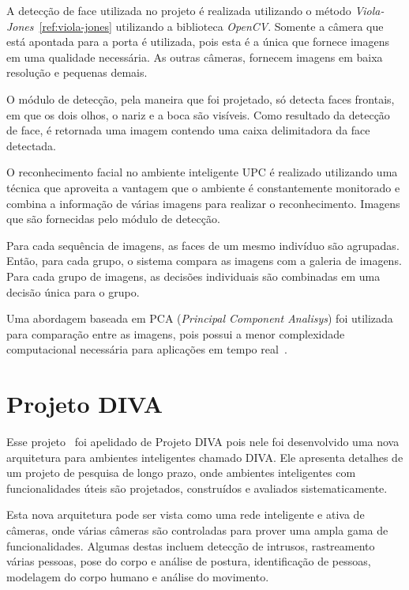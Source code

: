 A detecção de face utilizada no projeto é realizada utilizando o método \textit{Viola-Jones}~\ref{ref:viola-jones} utilizando a biblioteca \textit{OpenCV}. Somente a câmera que está apontada para a porta é utilizada, pois esta é a única que fornece imagens em uma qualidade necessária. As outras câmeras, fornecem imagens em baixa resolução e pequenas demais.  

O módulo de detecção, pela maneira que foi projetado, só detecta faces frontais, em que os dois olhos, o nariz e a boca são visíveis. Como resultado da detecção de face, é retornada uma imagem contendo uma caixa delimitadora da face detectada.

O reconhecimento facial no ambiente inteligente UPC é realizado utilizando uma técnica que aproveita a vantagem que o ambiente é constantemente monitorado e combina a informação de várias imagens para realizar o reconhecimento.  Imagens que são fornecidas pelo módulo de detecção.

Para cada sequência de imagens, as faces de um mesmo indivíduo são agrupadas. Então, para cada grupo, o sistema compara as imagens com a galeria de imagens. Para cada grupo de imagens, as decisões individuais são combinadas em uma decisão única para o grupo.

Uma abordagem baseada em PCA (\textit{Principal Component Analisys}) foi utilizada para comparação entre as imagens, pois possui a menor complexidade computacional necessária para aplicações em tempo real~\cite{salah}.


\section{Projeto DIVA}

Esse projeto~\cite{trivedi} foi apelidado de Projeto DIVA pois nele foi desenvolvido uma nova arquitetura para ambientes inteligentes chamado DIVA. Ele apresenta detalhes de um projeto de pesquisa de longo prazo, onde ambientes inteligentes com funcionalidades úteis são projetados, construídos e avaliados sistematicamente. 

Esta nova arquitetura pode ser vista como uma rede inteligente e ativa de câmeras, onde várias câmeras são controladas para prover uma ampla gama de funcionalidades. Algumas destas incluem detecção de intrusos, rastreamento várias pessoas, pose do corpo e análise de postura, identificação de pessoas, modelagem do corpo humano e análise do movimento.

